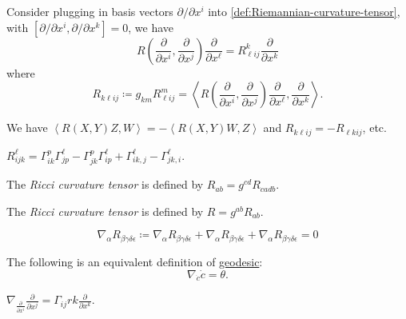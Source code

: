 Consider plugging in basis vectors \(\partial / \partial x^i\) into \autoref{def:Riemannian-curvature-tensor}, with \([\partial /\partial x^i, \partial / \partial x^k] = 0\), we have
\[
	R\left( \frac{\partial }{\partial x^i}, \frac{\partial }{\partial x^j} \right) \frac{\partial }{\partial x^{\ell } } = R^k_{\ell i j } \frac{\partial }{\partial x^k}
\]
where
\[
	R_{k \ell i j}
	\coloneqq g_{km}R^m_{\ell i j}
	= \left\langle R\left( \frac{\partial }{\partial x^i}, \frac{\partial }{\partial x^j} \right) \frac{\partial }{\partial x^{\ell } }, \frac{\partial }{\partial x^k}  \right\rangle.
\]

\begin{remark}
	We have \(\left\langle R(X, Y)Z, W \right\rangle = -\left\langle R(X, Y)W, Z \right\rangle\) and \(R_{k \ell i j} = -R_{\ell k i j}\), etc.
\end{remark}

\begin{remark}
	\(R^{\ell }_{ijk} = \Gamma _{ik}^p \Gamma ^\ell _{jp} - \Gamma ^p_{jk} \Gamma ^\ell _{ip} + \Gamma ^\ell _{ik, j} - \Gamma ^\ell _{jk, i}\).
\end{remark}

\begin{definition}\label{def:Ricci-curvature-tensor}
	The \emph{Ricci curvature tensor} is defined by \(R_{ab} = g^{cd}R_{cadb}\).
\end{definition}

\begin{definition}\label{def:scalar-curvature-tensor}
	The \emph{Ricci curvature tensor} is defined by \(R = g^{ab}R_{ab}\).
\end{definition}

\begin{proposition}
	\[
		\nabla _\alpha R_{\beta \gamma \delta \epsilon }
		\coloneqq \nabla _\alpha R_{\beta \gamma \delta \epsilon }
		+ \nabla _\alpha R_{\beta \gamma \delta \epsilon }
		+ \nabla _\alpha R_{\beta \gamma \delta \epsilon }
		= 0
	\]
\end{proposition}

The following is an equivalent definition of \hyperref[def:geodesic]{geodesic}:
\[
	\nabla _{\dot{c}}\dot{c} = \theta .
\]

\begin{notation}
	\(\nabla _{\frac{\partial }{\partial x^i} } \frac{\partial }{\partial x^j} = \Gamma _{ij}rk \frac{\partial }{\partial x^k} \).
\end{notation}

